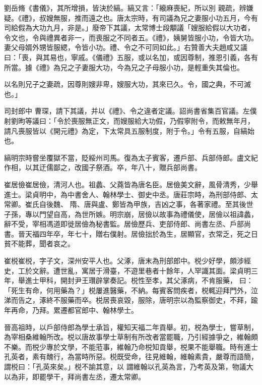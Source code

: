 \begin{pinyinscope}
 劉岳脩《書儀》，其所增損，皆決於縞。縞又言：「縗麻喪紀，所以別
 親疏，辨嫌疑。《禮》，叔嫂無服，推而遠之也。唐太宗時，有司議為兄之妻服小功五月，今有司給假為大功九月，非是。」廢帝下其議，太常博士段顒議「嫂服給假以大功者，令文也，令與禮異者非一，而喪服之不同者五。《禮》，姨舅皆服小功，令皆大功。妻父母婿外甥皆服緦，令皆小功。禮、令之不可同如此。」右贊善大夫趙咸又議曰：「喪，與其易也，寧戚。《儀禮》五服，或以名加，或因尊制，推恩引義，各有所當。據《禮》為兄之子妻服大功，今為兄之子母服小功，是輕重失其倫也。



 以名則兄子之妻疏，因尊則嫂非卑，嫂服大功，其來已久。令，國之典，不可滅也。」



 司封郎中
 曹琛，請下其議，并以《禮》、令之違者定議。詔尚書省集百官議。左僕射劉昫等議曰：「令於喪服無正文，而嫂服給大功假，乃假寧附令，而敕無年月，請凡喪服皆以《開元禮》為定，下太常具五服制度，附于令。」令有五服，自縞始也。



 縞明宗時嘗坐覆獄不當，貶綏州司馬。復為太子賓客，遷戶部、兵部侍郎。盧文紀作相，以其迂儒鄙之，改國子祭酒。卒，年八十，贈兵部尚書。



 崔居儉崔居儉，清河人也。祖蠡、父蕘皆為唐名臣。居儉美文辭，風骨清秀，少舉進士。梁貞明中，為中書舍人、翰林學士、御史中丞。唐莊宗時，為刑部侍郎、太常卿。崔氏自後魏、
 隋、唐與盧、鄭皆為甲族，吉凶之事，各著家禮。至其後世子孫，專以門望自高，為世所嫉。明宗崩，居儉以故事為禮儀使，居儉以祖諱蠡，辭不受，宰相馮道即徙居儉為秘書監。居儉歷兵、吏部侍郎、尚書左丞、戶部尚書。晉天福四年卒，年七十，贈右僕射。居儉拙於為生，居顯官，衣常乏，死之日貧不能葬，聞者哀之。



 崔棁崔棁，字子文，深州安平人也。父涿，唐末為刑部郎中。棁少好學，頗涉經史，工於文辭。遭世亂，寓居于滑臺，不遊里巷者十餘年，人罕識其面。梁貞明三年，舉進士甲科，開封尹王瓚辟掌奏記。棁性至孝，其父涿病，不肯服藥，
 曰：「死生有命，何用藥為？」棁屢進醫藥，不納。每賓客問疾者，棁輒迎拜門外，泣涕而告之，涿終不服藥而卒。棁居喪哀毀，服除，唐明宗以為監察御史，不拜，踰年再命，乃拜。累遷都官郎中、翰林學士。



 晉高祖時，以戶部侍郎為學士承旨，權知天福二年貢舉。初，棁為學士，嘗草制，為宰相桑維翰所改。棁以唐故事學士草制有所改者當罷職，乃引經據爭之，維翰頗不樂。而棁少專於文學，不能蒞事，維翰乃命棁知貢舉，棁果不能舉職。時有進士孔英者，素有醜行，為當時所惡。棁既受命，往見維翰，維翰素貴，嚴尊而語簡，謂棁曰：「孔英來矣。」棁不諭其意，以
 謂維翰以孔英為言，乃考英及第，物議大以為非，即罷學干，拜尚書左丞，遷太常卿。




\end{pinyinscope}
